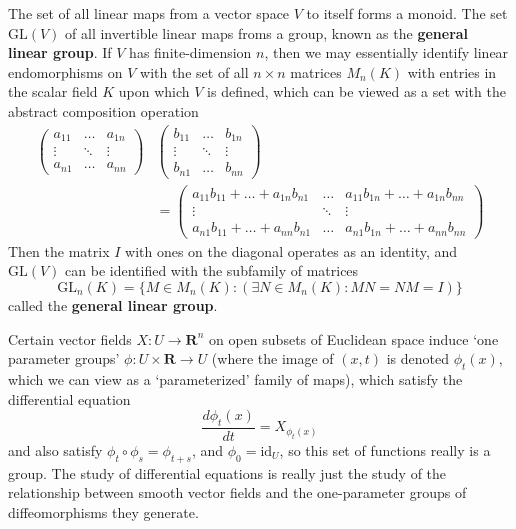 \begin{example}
    The set of all linear maps from a vector space $V$ to itself forms a monoid. The set $\mathrm{GL}(V)$ of all invertible linear maps froms a group, known as the {\bf general linear group}. If $V$ has finite-dimension $n$, then we may essentially identify linear endomorphisms on $V$ with the set of all $n\times n$ matrices $M_n(K)$ with entries in the scalar field $K$ upon which $V$ is defined, which can be viewed as a set with the abstract composition operation
    \begin{align*}
        \begin{pmatrix} a_{11} & \dots & a_{1n} \\ \vdots & \ddots & \vdots \\ a_{n1} & \dots & a_{nn} \end{pmatrix} & \begin{pmatrix} b_{11} & \dots & b_{1n} \\ \vdots & \ddots & \vdots \\ b_{n1} & \dots & b_{nn} \end{pmatrix}\\
        &= \begin{pmatrix} a_{11}b_{11} + \dots + a_{1n}b_{n1} & \dots & a_{11}b_{1n} + \dots + a_{1n}b_{nn} \\ \vdots & \ddots & \vdots \\ a_{n1}b_{11} + \dots + a_{nn}b_{n1} & \dots & a_{n1}b_{1n} + \dots + a_{nn}b_{nn} \end{pmatrix}
    \end{align*}
    Then the matrix $I$ with ones on the diagonal operates as an identity, and $\mathrm{GL}(V)$ can be identified with the subfamily of matrices
    \[ \mathrm{GL}_n(K) = \{ M \in M_n(K) : (\exists N \in M_n(K): MN = NM = I) \} \]
    called the {\bf general linear group}.
\end{example}

\begin{example}
    Certain vector fields $X: U \to \mathbf{R}^n$ on open subsets of Euclidean space induce `one parameter groups' $\phi: U \times \mathbf{R} \to U$ (where the image of $(x,t)$ is denoted $\phi_t(x)$, which we can view as a `parameterized' family of maps), which satisfy the differential equation
    \[ \frac{d \phi_t(x)}{dt} = X_{\phi_t(x)} \]
    and also satisfy $\phi_t \circ \phi_s = \phi_{t + s}$, and $\phi_0 = \text{id}_U$, so this set of functions really is a group. The study of differential equations is really just the study of the relationship between smooth vector fields and the one-parameter groups of diffeomorphisms they generate.
\end{example}

